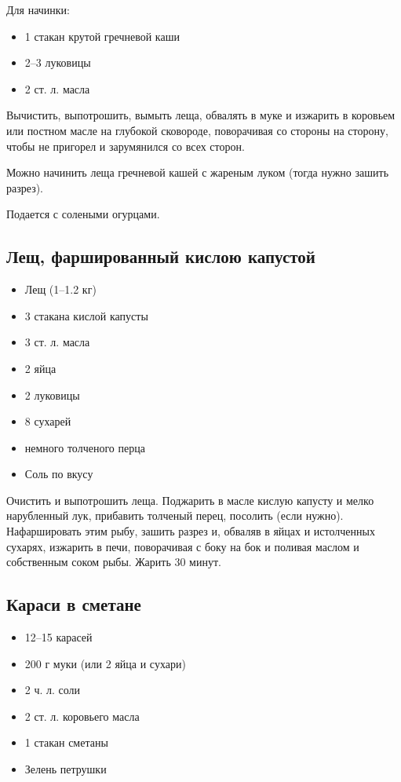 Для начинки: 

\begin{itemize} 
	\item  1 стакан крутой гречневой каши 
    \item  2–3 луковицы 
    \item  2 ст. л. масла
\end{itemize}

Вычистить, выпотрошить, вымыть леща, обвалять в муке и изжарить в коровьем или постном масле на глубокой сковороде, поворачивая со стороны на сторону, чтобы не пригорел и зарумянился со всех сторон.

Можно начинить леща гречневой кашей с жареным луком (тогда нужно зашить разрез).

Подается с солеными огурцами.

\subsection{Лещ, фаршированный кислою капустой}

\begin{itemize} 
	\item  Лещ (1–1.2 кг) 
    \item  3 стакана кислой капусты 
    \item  3 ст. л. масла 
    \item  2 яйца 
    \item  2 луковицы 
    \item  8 сухарей 
    \item  немного толченого перца 
    \item  Соль по вкусу
\end{itemize}

Очистить и выпотрошить леща. Поджарить в масле кислую капусту и мелко нарубленный лук, прибавить толченый перец, посолить (если нужно). Нафаршировать этим рыбу, зашить разрез и, обваляв в яйцах и истолченных сухарях, изжарить в печи, поворачивая с боку на бок и поливая маслом и собственным соком рыбы. Жарить 30 минут.

\subsection{Караси в сметане}

\begin{itemize} 
	\item  12–15 карасей 
    \item  200 г муки (или 2 яйца и сухари) 
    \item  2 ч. л. соли 
    \item  2 ст. л. коровьего масла 
    \item  1 стакан сметаны 
    \item  Зелень петрушки
\end{itemize}

